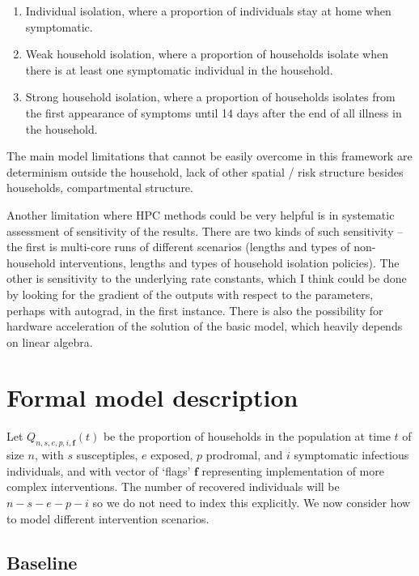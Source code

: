 \documentclass[10pt,a4paper]{article}
\begin{document}
\begin{enumerate}
\item Individual isolation, where a proportion of individuals stay at home
when symptomatic.
\item Weak household isolation, where a proportion of households isolate when
there is at least one symptomatic individual in the household.
\item Strong household isolation, where a proportion of households isolates
from the first appearance of symptoms until 14 days after the end of all illness
in the household.
\end{enumerate}

The main model limitations that cannot be easily overcome in this framework are
determinism outside the household, lack of other spatial / risk structure
besides households, compartmental structure.

Another limitation where HPC methods could be very helpful is in systematic
assessment of sensitivity of the results. There are two kinds of such
sensitivity -- the first is multi-core runs of different scenarios (lengths and
types of non-household interventions, lengths and types of household isolation
policies). The other is sensitivity to the underlying rate constants, which I
think could be done by looking for the gradient of the outputs with respect to
the parameters, perhaps with autograd, in the first instance.  There is also
the possibility for hardware acceleration of the solution of the basic model,
which heavily depends on linear algebra.

\section{Formal model description}

Let $Q_{n,s,e,p,i,\mathbf{f}}(t)$ be the proportion of households in the
population at time $t$ of size $n$, with $s$ susceptiples, $e$ exposed, $p$
prodromal, and $i$ symptomatic infectious individuals, and with vector of
`flags' $\mathbf{f}$ representing implementation of more complex interventions.
The number of recovered individuals will be $n-s-e-p-i$ so we do not need to
index this explicitly. We now consider how to model different intervention
scenarios.

\subsection{Baseline}
\end{document}
